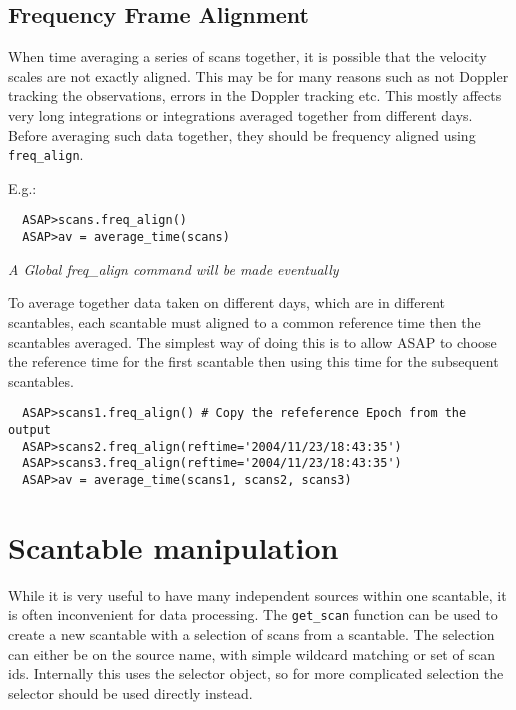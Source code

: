 \documentclass[11pt]{article}
\newcommand{\cmd}[1]{{\tt #1}}
\begin{document}
\subsection{Frequency Frame Alignment}
\label{sec:freqalign}

When time
averaging a series of scans together, it is possible that the velocity
scales are not exactly aligned.  This may be for many reasons such as
not Doppler tracking the observations, errors in the Doppler tracking
etc.  This mostly affects very long integrations or integrations
averaged together from different days.  Before averaging such data
together, they should be frequency aligned using \cmd{freq\_align}.

E.g.:

\begin{verbatim}
  ASAP>scans.freq_align()
  ASAP>av = average_time(scans)
\end{verbatim}

{\em A Global freq\_align command will be made eventually}

To average together data taken on different days, which are in
different scantables, each scantable must aligned to a common
reference time then the scantables averaged. The simplest way of
doing this is to allow ASAP to choose the reference time for the first
scantable then using this time for the subsequent scantables.

\begin{verbatim}
  ASAP>scans1.freq_align() # Copy the refeference Epoch from the output
  ASAP>scans2.freq_align(reftime='2004/11/23/18:43:35')
  ASAP>scans3.freq_align(reftime='2004/11/23/18:43:35')
  ASAP>av = average_time(scans1, scans2, scans3)
\end{verbatim}

\section{Scantable manipulation}

While it is very useful to have many
independent sources within one scantable, it is often inconvenient for
data processing. The \cmd{get\_scan} function can be used to create a
new scantable with a selection of scans from a scantable. The
selection can either be on the source name, with simple wildcard
matching or set of scan ids. Internally this uses the selector object,
so for more complicated selection the selector should be used directly
instead.
\end{document}
